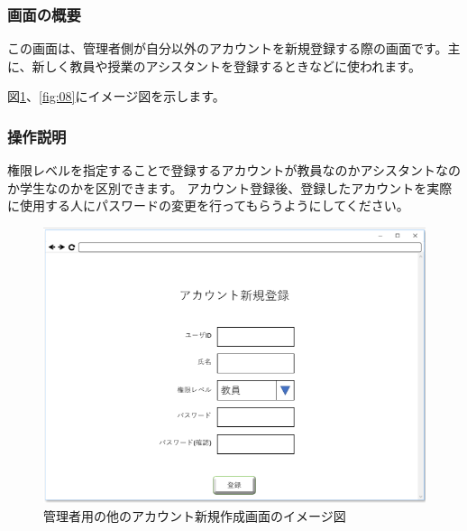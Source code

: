 \subsubsection{画面の概要}
この画面は、管理者側が自分以外のアカウントを新規登録する際の画面です。主に、新しく教員や授業のアシスタントを登録するときなどに使われます。

図\ref{fig:07}、\ref{fig:08}にイメージ図を示します。

\subsubsection{操作説明}
権限レベルを指定することで登録するアカウントが教員なのかアシスタントなのか学生なのかを区別できます。
アカウント登録後、登録したアカウントを実際に使用する人にパスワードの変更を行ってもらうようにしてください。

\begin{figure}[phtbp]
  \begin{center}
    \includegraphics[width=1\linewidth,clip]{./img/07.png}
    \caption{管理者用の他のアカウント新規作成画面のイメージ図}\label{fig:07}
  \end{center}
\end{figure}

